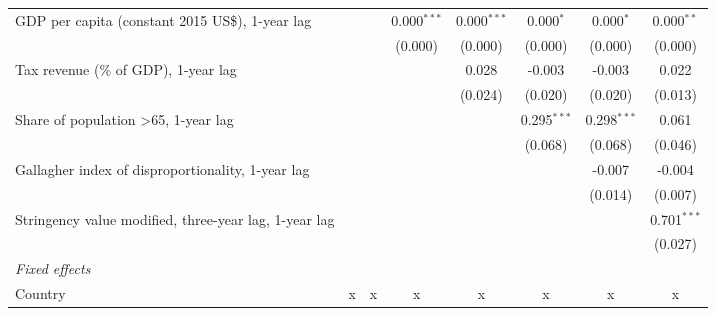 \begin{tabular}{lccccccc}
   GDP per capita (constant 2015 US\$), 1-year lag                                           &              &              & 0.000$^{***}$  & 0.000$^{***}$ & 0.000$^{*}$   & 0.000$^{*}$   & 0.000$^{**}$\\   
                                                                                             &              &              & (0.000)        & (0.000)       & (0.000)       & (0.000)       & (0.000)\\   
   Tax revenue (\% of GDP), 1-year lag                                                       &              &              &                & 0.028         & -0.003        & -0.003        & 0.022\\   
                                                                                             &              &              &                & (0.024)       & (0.020)       & (0.020)       & (0.013)\\   
   Share of population >65, 1-year lag                                                       &              &              &                &               & 0.295$^{***}$ & 0.298$^{***}$ & 0.061\\   
                                                                                             &              &              &                &               & (0.068)       & (0.068)       & (0.046)\\   
   Gallagher index of disproportionality, 1-year lag                                         &              &              &                &               &               & -0.007        & -0.004\\   
                                                                                             &              &              &                &               &               & (0.014)       & (0.007)\\   
   Stringency value modified, three-year lag, 1-year lag                                     &              &              &                &               &               &               & 0.701$^{***}$\\   
                                                                                             &              &              &                &               &               &               & (0.027)\\   
   \emph{Fixed effects}\\
   Country                                                                                   & x            & x            & x              & x             & x             & x             & x\\  

\end{tabular}
